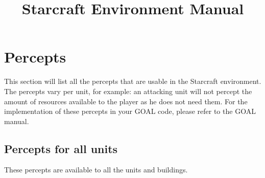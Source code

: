 \documentclass[english,11pt]{report}
\title{Starcraft Environment Manual}
\begin{document}
\maketitle
\tableofcontents

\chapter{Percepts}

This section will list all the percepts that are usable in the Starcraft environment. The percepts vary per unit, for example: an attacking unit will not percept the amount of resources available to the player as he does not need them. For the implementation of these percepts in your GOAL code, please refer to the GOAL manual.

\newpage
\section{Percepts for all units}
These percepts are available to all the units and buildings.
\end{document}
